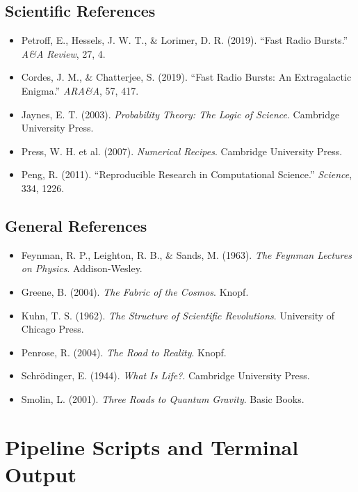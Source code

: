 \documentclass[11pt, letterpaper, openany]{book}
\begin{document}
\section*{Scientific References}

\begin{itemize}
    \item Petroff, E., Hessels, J. W. T., \& Lorimer, D. R. (2019). ``Fast Radio Bursts.'' \textit{A\&A Review}, 27, 4.
    \item Cordes, J. M., \& Chatterjee, S. (2019). ``Fast Radio Bursts: An Extragalactic Enigma.'' \textit{ARA\&A}, 57, 417.
    \item Jaynes, E. T. (2003). \textit{Probability Theory: The Logic of Science}. Cambridge University Press.
    \item Press, W. H. et al. (2007). \textit{Numerical Recipes}. Cambridge University Press.
    \item Peng, R. (2011). ``Reproducible Research in Computational Science.'' \textit{Science}, 334, 1226.
\end{itemize}

\section*{General References}

\begin{itemize}
    \item Feynman, R. P., Leighton, R. B., \& Sands, M. (1963). \textit{The Feynman Lectures on Physics}. Addison-Wesley.
    \item Greene, B. (2004). \textit{The Fabric of the Cosmos}. Knopf.
    \item Kuhn, T. S. (1962). \textit{The Structure of Scientific Revolutions}. University of Chicago Press.
    \item Penrose, R. (2004). \textit{The Road to Reality}. Knopf.
    \item Schrödinger, E. (1944). \textit{What Is Life?}. Cambridge University Press.
    \item Smolin, L. (2001). \textit{Three Roads to Quantum Gravity}. Basic Books.
\end{itemize}

\appendix
\chapter{Pipeline Scripts and Terminal Output}
\end{document}
